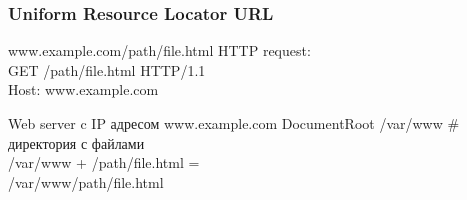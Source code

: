 \begin{frame}[fragile]
\frametitle{Uniform Resource Locator URL}

\begin{block}{www.example.com/path/file.html}
HTTP request: \\
GET /path/file.html HTTP/1.1 \\
Host: www.example.com 
\end{block}

\begin{block}{Web server c IP адресом www.example.com}
DocumentRoot /var/www   \# директория с файлами \\
/var/www + /path/file.html = \\
 /var/www/path/file.html  
\end{block}
\end{frame}
